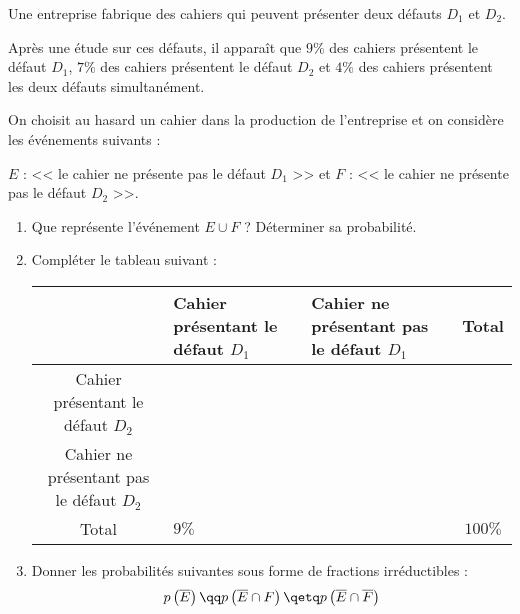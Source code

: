 \documentclass[10pt,openright,twoside,french]{book}
\begin{document}
\exo Une entreprise fabrique des cahiers qui peuvent présenter deux défauts $D_1$ et $D_2$.\par Après une étude sur ces défauts, il apparaît que $9\%$ des cahiers présentent le défaut $D_1$, $7\%$ des cahiers présentent le défaut $D_2$ et $4\%$ des cahiers présentent les deux défauts simultanément.\par
On choisit au hasard un cahier dans la production de l'entreprise et on considère les événements suivants :\par
$E$ : << le cahier ne présente pas le défaut $D_1$ >> et $F$ : << le cahier ne présente pas le défaut $D_2$ >>.
\begin{enumerate}
    \item Que représente l'événement $E \cup F$ ? Déterminer sa probabilité.
    \item Compléter le tableau suivant :
        \begin{center}
        \renewcommand\arraystretch{2}
            \begin{tabular}{|c|*{2}{>{\centering\arraybackslash}m{3cm}|}c|}
                \cline{2-4}
                     \multicolumn{1}{c|}{} & Cahier présentant le défaut $D_1$ & Cahier ne présentant pas le défaut $D_1$ & Total \\
                \hline
                    Cahier présentant le défaut $D_2$ & & & \\
                \hline
                    Cahier ne présentant pas le défaut $D_2$ & & & \\
                \hline
                    Total & $9\%$ & & $100\%$ \\
                \hline
            \end{tabular}
        \end{center}
    \item Donner les probabilités suivantes sous forme de fractions irréductibles :
    \[p\left(\overline E\right) \qq p\left(\overline E \cap F\right) \qetq p\left(\overline E \cap \overline F\right)\]
\end{enumerate}
\end{document}
